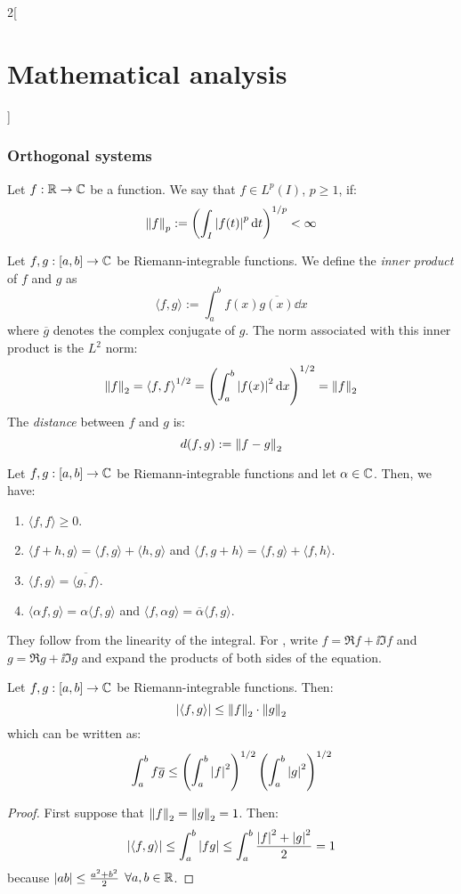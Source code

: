 \documentclass[../../../main_math.tex]{subfiles}
\begin{document}
\begin{multicols}{2}[\section{Mathematical analysis}]
  \subsubsection{Orthogonal systems}
  \begin{definition}
    Let $f:\mathbb{R} \rightarrow\mathbb{C} $ be a function. We say that $f\in L^p(I)$, $p\geq1$, if: $$\left\|f\right\|_p:=\left(\int_I\abs{f(t)}^p\dd{t}\right)^{1/p}<\infty$$
  \end{definition}
  \begin{definition}
    Let $f,g:[a,b]\rightarrow\mathbb{C} $ be Riemann-integrable functions. We define the \emph{inner product} of $f$ and $g$ as $$\langle f,g\rangle:=\int_a^bf(x)\overline{g(x)}\dd{x}$$ where $\overline{g}$ denotes the complex conjugate of $g$. The norm associated with this inner product is the $L^2$ norm: $$\left\|f\right\|_2={\langle f,f\rangle}^{1/2}=\left(\int_a^b{|f(x)|}^2\dd{x}\right)^{1/2}=\left\|f\right\|_2$$ The \emph{distance} between $f$ and $g$ is: $$d(f,g):=\left\|f-g\right\|_2$$
  \end{definition}
  \begin{proposition}
    Let $f,g:[a,b]\rightarrow\mathbb{C} $ be Riemann-integrable functions and let $\alpha\in\mathbb{C} $. Then, we have:
    \begin{enumerate}
      \item $\langle f,f\rangle\geq 0$.
      \item $\langle f+h,g\rangle=\langle f,g\rangle+\langle h,g\rangle$ and $\langle f,g+h\rangle=\langle f,g\rangle+\langle f,h\rangle$.
      \item\label{MA:orto3} $\langle f,g\rangle=\overline{\langle g,f\rangle}$.
      \item $\langle \alpha f,g\rangle=\alpha\langle f,g\rangle$ and $\langle f,\alpha g\rangle=\overline{\alpha}\langle f,g\rangle$.
    \end{enumerate}
  \end{proposition}
  \begin{sproof}
    They follow from the linearity of the integral. For , write $f=\Re f+\ii \Im f$ and $g=\Re g+\ii \Im g$ and expand the products of both sides of the equation.
  \end{sproof}
  \begin{theorem}\label{MA:cauchyschwarz}
    Let $f,g:[a,b]\rightarrow\mathbb{C} $ be Riemann-integrable functions. Then: $$\abs{\langle f,g\rangle}\leq{\left\|f\right\|_2}\cdot{\left\|g\right\|_2}$$ which can be written as: $$\int_a^bf\overline{g}\leq\left(\int_a^b\abs{f}^2\right)^{1/2}\left(\int_a^b\abs{g}^2\right)^{1/2}$$
  \end{theorem}
  \begin{proof}
    First suppose that ${\left\|f\right\|_2}={\left\|g\right\|_2}=1$. Then:
    $$\abs{\langle f,g\rangle}\leq\int_a^b\abs{fg}\leq\int_a^b\frac{\abs{f}^2+\abs{g}^2}{2}=1$$
    because $\abs{ab}\leq \frac{a^2+b^2}{2}$ $\forall a,b\in\mathbb{R}$.


\end{proof}
\end{multicols}
\end{document}
